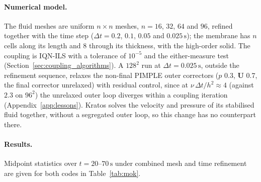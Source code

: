 \paragraph{Numerical model.}
The fluid meshes are uniform $n\times n$ meshes, $n = 16$, $32$, $64$ and $96$, refined together with the time step ($\Delta t = 0.2$, $0.1$, $0.05$ and $0.025\,\mathrm{s}$); the membrane has $n$ cells along its length and 8 through its thickness, with the high-order solid.
The coupling is IQN-ILS with a tolerance of $10^{-5}$ and the either-measure test (Section~\ref{sec:coupling_algorithms}).
A $128^2$ run at $\Delta t = 0.025\,\mathrm{s}$, outside the refinement sequence, relaxes the non-final PIMPLE outer correctors ($p$ 0.3, $\mathbf{U}$ 0.7, the final corrector unrelaxed) with residual control, since at $\nu\,\Delta t/h^2 \approx 4$ (against $2.3$ on $96^2$) the unrelaxed outer loop diverges within a coupling iteration (Appendix~\ref{app:lessons}). Kratos solves the velocity and pressure of its stabilised fluid together, without a segregated outer loop, so this change has no counterpart there.

\paragraph{Results.}
Midpoint statistics over $t = 20$--$70\,\mathrm{s}$ under combined mesh and time refinement are given for both codes in Table~\ref{tab:mok}.

